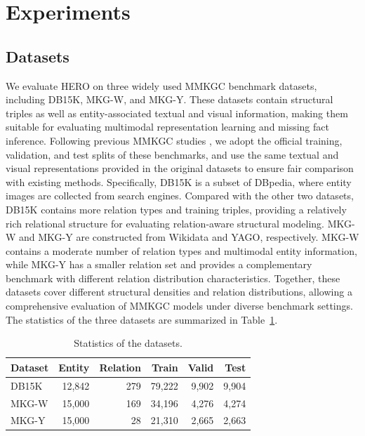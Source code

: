 \documentclass[pdflatex,sn-mathphys-num]{sn-jnl}
\begin{document}
\section{Experiments}
\label{sec:experiments}
\subsection{Datasets}

We evaluate HERO on three widely used MMKGC benchmark datasets, including DB15K, MKG-W, and MKG-Y. These datasets contain structural triples as well as entity-associated textual and visual information, making them suitable for evaluating multimodal representation learning and missing fact inference. Following previous MMKGC studies \cite{li2023imf,zhang2025momok,liu2026mhyper}, we adopt the official training, validation, and test splits of these benchmarks, and use the same textual and visual representations provided in the original datasets to ensure fair comparison with existing methods.
Specifically, DB15K is a subset of DBpedia, where entity images are collected from search engines. Compared with the other two datasets, DB15K contains more relation types and training triples, providing a relatively rich relational structure for evaluating relation-aware structural modeling. MKG-W and MKG-Y are constructed from Wikidata and YAGO, respectively. MKG-W contains a moderate number of relation types and multimodal entity information, while MKG-Y has a smaller relation set and provides a complementary benchmark with different relation distribution characteristics. Together, these datasets cover different structural densities and relation distributions, allowing a comprehensive evaluation of MMKGC models under diverse benchmark settings.
The statistics of the three datasets are summarized in Table~\ref{tab:datasets}. 

\begin{table}[t]
\centering
\caption{Statistics of the datasets.}
\label{tab:datasets}
\begin{tabular}{lrrrrr}
\toprule
\textbf{Dataset} & \textbf{Entity} & \textbf{Relation} & \textbf{Train} & \textbf{Valid} & \textbf{Test} \\
\midrule
DB15K & 12,842 & 279 & 79,222 & 9,902 & 9,904 \\
MKG-W & 15,000 & 169 & 34,196 & 4,276 & 4,274 \\
MKG-Y & 15,000 & 28 & 21,310 & 2,665 & 2,663 \\
\bottomrule
\end{tabular}
\end{table}
\end{document}
